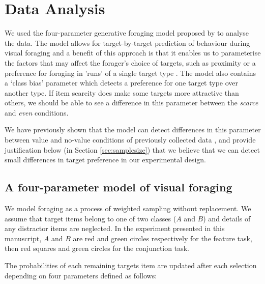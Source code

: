 \documentclass[12pt]{article}
\begin{document}
\section{Data Analysis}

We used the four-parameter generative foraging model proposed by \citep{clarke2022foraging} to analyse the data. The model allows for target-by-target prediction of behaviour during visual foraging \citep{clarke2022bayesian} and a benefit of this approach is that it enables us to parameterise the factors that may affect the forager's choice of targets, such as proximity or a preference for foraging in 'runs' of a single target type \citep{kristjansson2014common}. The model also contains a `class bias' parameter which detects a preference for one target type over another type. If item scarcity does make some targets more attractive than others, we should be able to see a difference in this parameter between the \textit{scarce} and \textit{even} conditions. 

We have previously shown that the model can detect differences in this parameter between value and no-value conditions of previously collected data \citep{clarke2022foraging, tagu2022selection}, and provide justification below (in Section \ref{sec:samplesize}) that we believe that we can detect small differences in target preference in our experimental design.

\subsection{A four-parameter model of visual foraging}

\label{sec_modeloverview}
We model foraging as a process of weighted sampling without replacement. We assume that target items belong to one of two classes ($A$ and $B$) and details of any distractor items are neglected. In the experiment presented in this manuscript, $A$ and $B$ are red and green circles respectively for the feature task, then red squares and green circles for the conjunction task.   

The probabilities of each remaining targets item are updated after each selection depending on four parameters defined as follows:
\end{document}
